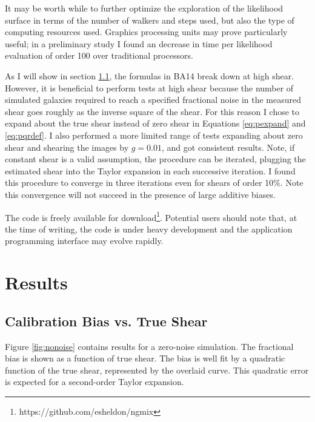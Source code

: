 \documentclass[usegraphicx,usenatbib]{mn2e}
\begin{document}
It may be worth while to further optimize the exploration of the likelihood
surface in terms of the number of walkers and steps used, but also the type of
computing resources used.  Graphics processing units may prove particularly
useful; in a preliminary study I found an decrease in time per likelihood
evaluation of order 100 over traditional processors.


As I will show in section \ref{sec:truebias}, the formulas in BA14 break down
at high shear.  However, it is beneficial to perform tests at high shear
because the number of simulated galaxies required to reach a specified
fractional noise in the measured shear goes roughly as the inverse square of
the shear.  For this reason I chose to expand about the true shear instead of
zero shear in Equations \ref{eq:pexpand} and \ref{eq:pqrdef}.  I also performed
a more limited range of tests expanding about zero shear and shearing the
images by $g=0.01$, and got consistent results.   Note, if constant shear is a
valid assumption, the procedure can be iterated, plugging the estimated shear
into the Taylor expansion in each successive iteration.  I found this procedure
to converge in three iterations even for shears of order 10\%. Note this
convergence will not succeed in the presence of large additive biases.

The code is freely available for
download\footnote{https://github.com/esheldon/ngmix}.  Potential users should
note that, at the time of writing, the code is under heavy development and the
application programming interface may evolve rapidly.

\section{Results} \label{sec:results}

\subsection{Calibration Bias vs. True Shear} \label{sec:truebias}

Figure \ref{fig:nonoise} contains results for a zero-noise simulation.  The
fractional bias is shown as a function of true shear.  The bias is well fit by
a quadratic function of the true shear, represented by the overlaid curve. This
quadratic error is expected for a second-order Taylor expansion.
\end{document}
